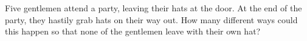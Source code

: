 \documentclass{book}
\begin{document}
\setcounter{cpjt}{229}
\addtocounter{cpjt}{-1}
\begin{activity}\label{activity-222}
\hypertarget{p-1224}{}%
Five gentlemen attend a party, leaving their hats at the door. At the end of the party, they hastily grab hats on their way out. How many different ways could this happen so that none of the gentlemen leave with their own hat?%
\par\smallskip%
\noindent\end{activity}

\clearpage
\end{document}
